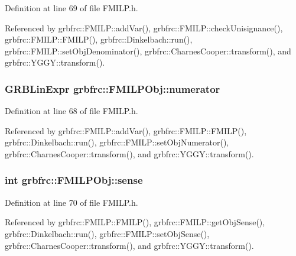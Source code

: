 Definition at line 69 of file F\+M\+I\+L\+P.\+h.



Referenced by grbfrc\+::\+F\+M\+I\+L\+P\+::add\+Var(), grbfrc\+::\+F\+M\+I\+L\+P\+::check\+Unisignance(), grbfrc\+::\+F\+M\+I\+L\+P\+::\+F\+M\+I\+L\+P(), grbfrc\+::\+Dinkelbach\+::run(), grbfrc\+::\+F\+M\+I\+L\+P\+::set\+Obj\+Denominator(), grbfrc\+::\+Charnes\+Cooper\+::transform(), and grbfrc\+::\+Y\+G\+G\+Y\+::transform().

\subsubsection[{\texorpdfstring{numerator}{numerator}}]{\setlength{\rightskip}{0pt plus 5cm}G\+R\+B\+Lin\+Expr grbfrc\+::\+F\+M\+I\+L\+P\+Obj\+::numerator}\hypertarget{structgrbfrc_1_1FMILPObj_a01c26f8e99a6692909e562aa561c9274}{}\label{structgrbfrc_1_1FMILPObj_a01c26f8e99a6692909e562aa561c9274}


Definition at line 68 of file F\+M\+I\+L\+P.\+h.



Referenced by grbfrc\+::\+F\+M\+I\+L\+P\+::add\+Var(), grbfrc\+::\+F\+M\+I\+L\+P\+::\+F\+M\+I\+L\+P(), grbfrc\+::\+Dinkelbach\+::run(), grbfrc\+::\+F\+M\+I\+L\+P\+::set\+Obj\+Numerator(), grbfrc\+::\+Charnes\+Cooper\+::transform(), and grbfrc\+::\+Y\+G\+G\+Y\+::transform().

\subsubsection[{\texorpdfstring{sense}{sense}}]{\setlength{\rightskip}{0pt plus 5cm}int grbfrc\+::\+F\+M\+I\+L\+P\+Obj\+::sense}\hypertarget{structgrbfrc_1_1FMILPObj_a65e9d84a220fc53712fb1dd7a30cad59}{}\label{structgrbfrc_1_1FMILPObj_a65e9d84a220fc53712fb1dd7a30cad59}


Definition at line 70 of file F\+M\+I\+L\+P.\+h.



Referenced by grbfrc\+::\+F\+M\+I\+L\+P\+::\+F\+M\+I\+L\+P(), grbfrc\+::\+F\+M\+I\+L\+P\+::get\+Obj\+Sense(), grbfrc\+::\+Dinkelbach\+::run(), grbfrc\+::\+F\+M\+I\+L\+P\+::set\+Obj\+Sense(), grbfrc\+::\+Charnes\+Cooper\+::transform(), and grbfrc\+::\+Y\+G\+G\+Y\+::transform().

